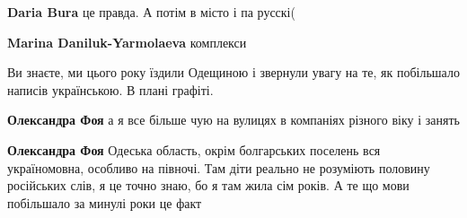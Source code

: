 \begin{itemize}
{\begin{itemize}
{%
 

\textbf{Daria Bura} це правда. А потім в місто і па русскі(

 
\textbf{Marina Daniluk-Yarmolaeva} комплекси
}\end{itemize}

 
Ви знаєте, ми цього року їздили Одещиною і звернули увагу на те, як побільшало
написів українською. В плані графіті.

\begin{itemize}{
 

\textbf{Олександра Фоя} а я все більше чую на вулицях в компаніях різного віку і занять

 
\textbf{Олександра Фоя} Одеська область, окрім болгарських поселень вся україномовна, особливо на півночі. Там діти реально не розуміють половину російських слів, я це точно знаю, бо я там жила сім років. А те що мови побільшало за минулі роки це факт

 
}
\end{itemize}}
\end{itemize}
